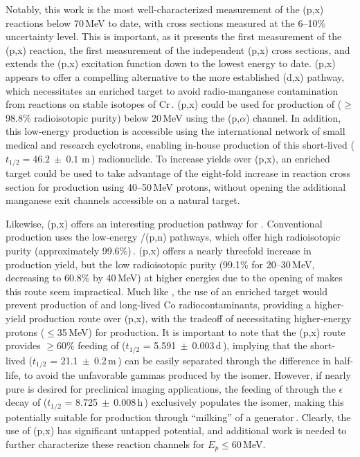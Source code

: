 Notably, this work is the most well-characterized measurement of the (p,x) reactions below 70\,MeV to date, with cross sections measured  at the 6--10\% uncertainty level.
This is important, as it presents the first measurement of the (p,x) reaction,  the first measurement of the independent (p,x) cross sections, and extends the (p,x) excitation function down to the lowest energy to date. 
(p,x) appears to offer a compelling alternative to the more established (d,x) pathway, which necessitates an enriched  target to avoid radio-manganese contamination from reactions on stable isotopes of Cr\,\cite{Klein2000}.
(p,x) could be used for 
production of   ($\geq$98.8\% radioisotopic purity) below 20\,MeV using the (p,$\alpha$) channel.
In addition, this low-energy production is accessible using the international network of small medical and research cyclotrons, enabling in-house production of this short-lived ($t_{1/2}=46.2~\pm~0.1$ m\,\cite{Wang2017}) radionuclide.
To increase yields over (p,x), an enriched  target could be used to take advantage of the eight-fold increase in reaction cross section for production using 40--50\,MeV protons, without opening the additional manganese exit channels accessible on a natural target.



Likewise, (p,x) offers an interesting production pathway for  .
Conventional production uses the low-energy /(p,n) pathways, which offer high radioisotopic purity (approximately 99.6\%)\,\cite{Graves2015,Wooten2015}.
(p,x) offers a nearly threefold increase in production yield, but the low radioisotopic purity (99.1\% for 20--30\,MeV, decreasing to 60.8\% by 40\,MeV) at higher energies due to the opening of  makes this route seem impractical.
Much like , the use of an enriched  target would prevent production of  and long-lived Co radiocontaminants, providing a higher-yield production route over   (p,x), with the tradeoff of necessitating higher-energy protons ($\leq$35\,MeV) for production.
It is important to note that the (p,x) route provides $\geq$60\% feeding of  ($t_{1/2}$ = 5.591$~\pm~$0.003\,d\,\cite{Dong2015}), implying that the short-lived   ($t_{1/2}$ = 21.1$~\pm~$0.2\,m\,\cite{Dong2015}) can be easily separated through the difference in half-life, to avoid the unfavorable gammas produced by the isomer. 
However, if nearly pure  is desired for preclinical imaging applications, the feeding of  through the $\epsilon$ decay of  ($t_{1/2}$ = 8.725$~\pm~$0.008\,h\,\cite{Dong2015}) exclusively populates the isomer, making this potentially suitable for production through \enquote{milking} of a  generator\,\cite{Blauenstein1997}.
Clearly, the use of (p,x) has significant untapped potential, and additional work is needed to further characterize these reaction channels for $E_p \leq$60\,MeV.


